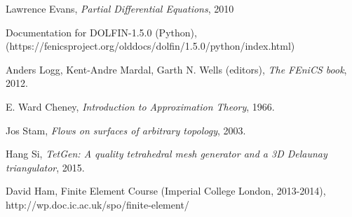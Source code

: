 \documentclass[11pt,a4paper]{memoir}
\begin{document}
\begin{thebibliography}{9}
Lawrence Evans, \textit{Partial Differential Equations}, 2010

Documentation for DOLFIN-1.5.0 (Python),\\
(https://fenicsproject.org/olddocs/dolfin/1.5.0/python/index.html)

Anders Logg, Kent-Andre Mardal, Garth N. Wells (editors), \textit{The FEniCS book}, 2012.

E. Ward Cheney, \textit{Introduction to Approximation Theory}, 1966.

Jos Stam, \textit{Flows on surfaces of arbitrary topology}, 2003.

Hang Si, \textit{TetGen: A quality tetrahedral mesh generator and a 3D Delaunay triangulator}, 2015.

David Ham, Finite Element Course (Imperial College London, 2013-2014),\\
http://wp.doc.ic.ac.uk/spo/finite-element/

\end{thebibliography}
\end{document}
